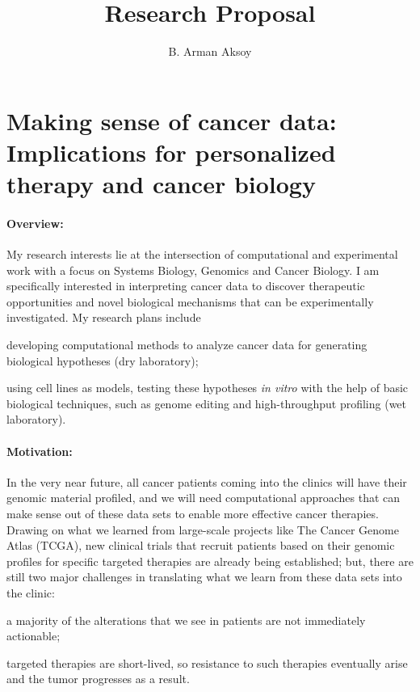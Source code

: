 \documentclass[11pt,letterpaper]{article}
\title{Research Proposal}
\author{B. Arman Aksoy}
\date{}
\begin{document}
\maketitle

\section*{Making sense of cancer data: Implications for personalized therapy and cancer biology}
\paragraph{Overview:}
My research interests lie at the intersection of computational and experimental work with a focus on Systems Biology, Genomics and Cancer Biology.
I am specifically interested in interpreting cancer data to discover therapeutic opportunities and novel biological mechanisms that can be experimentally investigated.
My research plans include
\begin{inparaenum}[(i)]
 \item developing computational methods to analyze cancer data for generating biological hypotheses (dry laboratory);
 \item using cell lines as models, testing these hypotheses \textit{in vitro} with the help of basic biological techniques, such as genome editing and high-throughput profiling (wet laboratory).
\end{inparaenum}

\paragraph{Motivation:}
In the very near future, all cancer patients coming into the clinics will have their genomic material profiled,
and we will need computational approaches that can make sense out of these data sets to enable more effective cancer therapies.
Drawing on what we learned from large-scale projects like The Cancer Genome Atlas (TCGA), 
new clinical trials that recruit patients based on their genomic profiles for specific targeted therapies are already being established;
but, there are still two major challenges in translating what we learn from these data sets into the clinic:
\begin{inparaenum}[(i)]
 \item a majority of the alterations that we see in patients are not immediately actionable;
 \item targeted therapies are short-lived, so resistance to such therapies eventually arise and the tumor progresses as a result.
\end{inparaenum}
\end{document}
